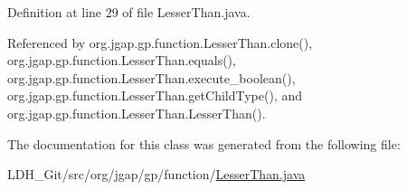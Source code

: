 Definition at line 29 of file Lesser\-Than.\-java.



Referenced by org.\-jgap.\-gp.\-function.\-Lesser\-Than.\-clone(), org.\-jgap.\-gp.\-function.\-Lesser\-Than.\-equals(), org.\-jgap.\-gp.\-function.\-Lesser\-Than.\-execute\-\_\-boolean(), org.\-jgap.\-gp.\-function.\-Lesser\-Than.\-get\-Child\-Type(), and org.\-jgap.\-gp.\-function.\-Lesser\-Than.\-Lesser\-Than().



The documentation for this class was generated from the following file\-:\begin{DoxyCompactItemize}
\item 
L\-D\-H\-\_\-\-Git/src/org/jgap/gp/function/\hyperlink{_lesser_than_8java}{Lesser\-Than.\-java}\end{DoxyCompactItemize}
